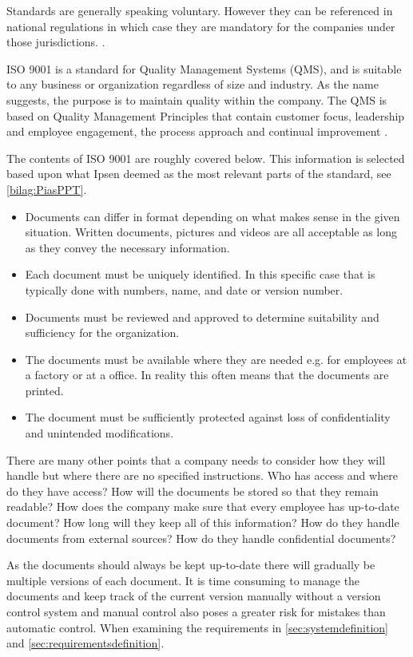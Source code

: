 Standards are generally speaking voluntary. However they can be referenced in national regulations in which case they are mandatory for the companies under those jurisdictions. \cite{ISOreviewedevery5years}.

ISO 9001 is a standard for Quality Management Systems (QMS), and is suitable to any business or organization regardless of size and industry. As the name suggests, the purpose is to maintain quality within the company. \cite{ISO9001}
The QMS is based on Quality Management Principles that contain customer focus, leadership and employee engagement, the process approach and continual improvement \cite{ISO9001-2}.

The contents of ISO 9001 are roughly covered below. This information is selected based upon what Ipsen deemed as the most relevant parts of the standard, see \cref{bilag:PiasPPT}.

\begin{itemize}
	\item
	Documents can differ in format depending on what makes sense in the given situation. 
	Written documents, pictures and videos are all acceptable as long as they convey the necessary information.
	\item
	Each document must be uniquely identified.
	In this specific case that is typically done with numbers, name, and date or version number.
	\item
	Documents must be reviewed and approved to determine suitability and sufficiency for the organization.
	\item
	The documents must be available where they are needed e.g. for employees at a factory or at a office.
	In reality this often means that the documents are printed.
	\item
	The document must be sufficiently protected against loss of confidentiality and unintended modifications.
\end{itemize}

There are many other points that a company needs to consider how they will handle but where there are no specified instructions.
Who has access and where do they have access?
How will the documents be stored so that they remain readable?
How does the company make sure that every employee has up-to-date document?
How long will they keep all of this information?
How do they handle documents from external sources?
How do they handle confidential documents?

As the documents should always be kept up-to-date there will gradually be multiple versions of each document.
It is time consuming to manage the documents and keep track of the current version manually without a version control system and manual control also poses a greater risk for mistakes than automatic control.
When examining the requirements in \cref{sec:systemdefinition} and \cref{sec:requirementsdefinition}.